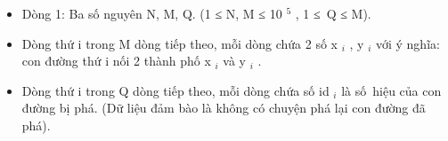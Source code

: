 \begin{itemize}
	\item     Dòng 1: Ba số nguyên N, M, Q. (1 ≤ N, M ≤ 10    $^     5    $    , 1 ≤ Q ≤ M).   
	\item     Dòng thứ i trong M dòng tiếp theo, mỗi dòng chứa 2 số x    $_     i    $    , y    $_     i    $    với ý nghĩa: con đường thứ i nối 2 thành phố x    $_     i    $    và y    $_     i    $    .   
	\item     Dòng thứ i trong Q dòng tiếp theo, mỗi dòng chứa số id    $_     i    $    là số hiệu của con đường bị phá. (Dữ liệu đảm bào là không có chuyện phá lại con đường đã phá).   
\end{itemize}

\